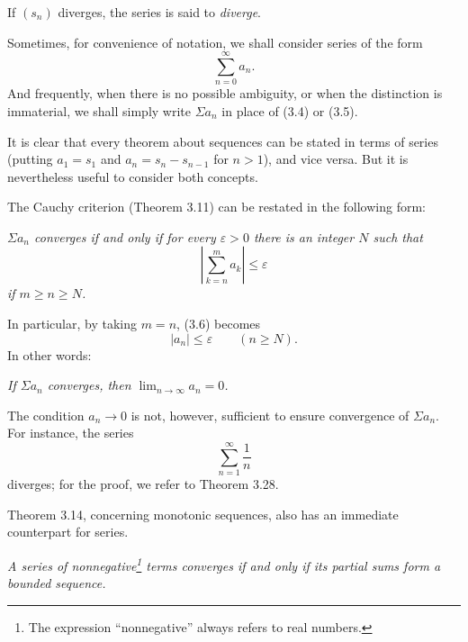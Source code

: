 If $(s_n)$ diverges, the series is said to \emph{diverge}.

Sometimes, for convenience of notation, we shall consider series of the form
\begin{equation}
  \sum_{n=0}^{\infty} a_n. \tag{3.5}
\end{equation}
And frequently, when there is no possible ambiguity, or when the distinction is
immaterial, we shall simply write $\Sigma a_n$ in place of (3.4) or (3.5).

It is clear that every theorem about sequences can be stated in terms of series
(putting $a_1 = s_1$ and $a_n = s_n - s_{n-1}$ for $n > 1$), and vice versa.
But it is nevertheless useful to consider both concepts.

The Cauchy criterion (Theorem 3.11) can be restated in the following form:

\emph{$\Sigma a_n$ converges if and only if for every $\varepsilon > 0$ there
is an integer $N$ such that}
\begin{equation}
  \left|\sum_{k=n}^{m} a_k\right| \le \varepsilon \tag{3.6}
\end{equation}
\emph{if $m \ge n \ge N$.}

In particular, by taking $m = n$, (3.6) becomes
\[ |a_n| \le \varepsilon \qquad (n \ge N). \]
In other words:

\emph{If $\Sigma a_n$ converges, then $\lim_{n\to\infty} a_n = 0$.}

The condition $a_n \to 0$ is not, however, sufficient to ensure convergence of
$\Sigma a_n$. For instance, the series
\[ \sum_{n=1}^{\infty} \frac{1}{n} \]
diverges; for the proof, we refer to Theorem 3.28.

Theorem 3.14, concerning monotonic sequences, also has an immediate
counterpart for series.

\emph{A series of nonnegative\footnote{The expression ``nonnegative'' always
refers to real numbers.} terms converges if and only if its partial sums form a
bounded sequence.}

